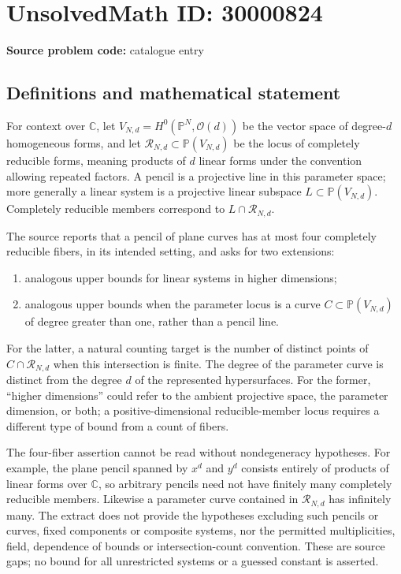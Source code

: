 \documentclass[11pt]{article}
\newcommand{\C}{\mathbb{C}}
\newcommand{\PP}{\mathbb{P}}
\begin{document}
\section*{UnsolvedMath ID: 30000824}
\textbf{Source problem code:} catalogue entry
\subsection{Definitions and mathematical statement}
For context over $\C$, let $V_{N,d}=H^0(\PP^N,\mathcal O(d))$ be the vector space of degree-$d$ homogeneous forms, and let $\mathcal R_{N,d}\subset\PP(V_{N,d})$ be the locus of completely reducible forms, meaning products of $d$ linear forms under the convention allowing repeated factors. A pencil is a projective line in this parameter space; more generally a linear system is a projective linear subspace $L\subset\PP(V_{N,d})$. Completely reducible members correspond to $L\cap\mathcal R_{N,d}$.

The source reports that a pencil of plane curves has at most four completely reducible fibers, in its intended setting, and asks for two extensions:
\begin{enumerate}
\item analogous upper bounds for linear systems in higher dimensions;
\item analogous upper bounds when the parameter locus is a curve $C\subset\PP(V_{N,d})$ of degree greater than one, rather than a pencil line.
\end{enumerate}
For the latter, a natural counting target is the number of distinct points of $C\cap\mathcal R_{N,d}$ when this intersection is finite. The degree of the parameter curve is distinct from the degree $d$ of the represented hypersurfaces. For the former, ``higher dimensions'' could refer to the ambient projective space, the parameter dimension, or both; a positive-dimensional reducible-member locus requires a different type of bound from a count of fibers.

The four-fiber assertion cannot be read without nondegeneracy hypotheses. For example, the plane pencil spanned by $x^d$ and $y^d$ consists entirely of products of linear forms over $\C$, so arbitrary pencils need not have finitely many completely reducible members. Likewise a parameter curve contained in $\mathcal R_{N,d}$ has infinitely many. The extract does not provide the hypotheses excluding such pencils or curves, fixed components or composite systems, nor the permitted multiplicities, field, dependence of bounds or intersection-count convention. These are source gaps; no bound for all unrestricted systems or a guessed constant is asserted.
\end{document}
